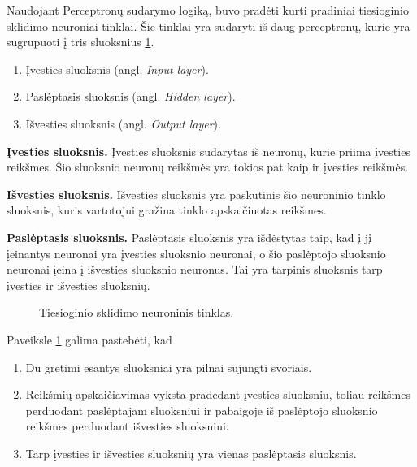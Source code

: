 Naudojant Perceptronų sudarymo logiką, buvo pradėti kurti pradiniai tiesioginio sklidimo neuroniai tinklai. Šie tinklai yra sudaryti iš daug perceptronų, kurie yra sugrupuoti į tris sluoksnius \ref{fig:feedforfff}.
\begin{enumerate}
  \item Įvesties sluoksnis (angl. \textit{Input layer}).
  \item Paslėptasis sluoksnis (angl. \textit{Hidden layer}).
  \item Išvesties sluoksnis (angl. \textit{Output layer}).
\end{enumerate}

\textbf{Įvesties sluoksnis.} Įvesties sluoksnis sudarytas iš neuronų, kurie priima įvesties reikšmes. Šio sluoksnio neuronų reikšmės yra tokios pat kaip ir įvesties reikšmės. \cite{Sibanjan2017}

\textbf{Išvesties sluoksnis.} Išvesties sluoksnis yra paskutinis šio neuroninio tinklo sluoksnis, kuris vartotojui gražina tinklo apskaičiuotas reikšmes. \cite{Sibanjan2017}

\textbf{Paslėptasis sluoksnis.} Paslėptasis sluoksnis yra išdėstytas taip, kad į jį įeinantys neuronai yra įvesties sluoksnio neuronai, o šio paslėptojo sluoksnio neuronai įeina į išvesties sluoksnio neuronus. Tai yra tarpinis sluoksnis tarp įvesties ir išvesties sluoksnių. \cite{Sibanjan2017}

\begin{figure}[h!]
  \centering
{}
\caption{Tiesioginio sklidimo neuroninis tinklas.}
\label{fig:feedforfff}
\end{figure}

Paveiksle \ref{fig:feedforfff} galima pastebėti, kad
\begin{enumerate}
  \item Du gretimi esantys sluoksniai yra pilnai sujungti svoriais.
  \item Reikšmių apskaičiavimas vyksta pradedant įvesties sluoksniu, toliau reikšmes perduodant paslėptajam sluoksniui ir pabaigoje iš paslėptojo sluoksnio reikšmes perduodant išvesties sluoksniui.
  \item Tarp įvesties ir išvesties sluoksnių yra vienas paslėptasis sluoksnis.
\end{enumerate}


